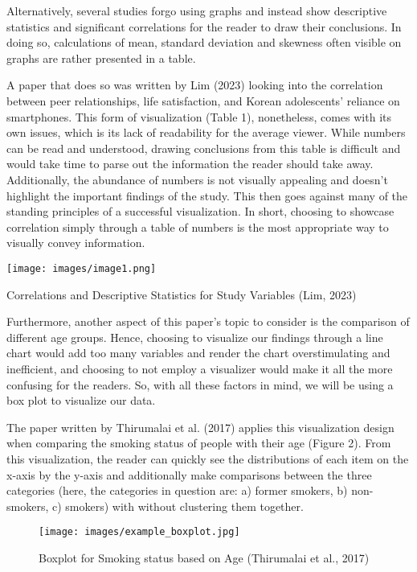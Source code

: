 \documentclass[12pt, a4paper]{article}
\begin{document}
\par Alternatively, several studies forgo using graphs and instead show descriptive statistics and significant correlations for the reader to draw their conclusions. In doing so, calculations of mean, standard deviation and skewness often visible on graphs are rather presented in a table.
\par A paper that does so was written by Lim (2023) looking into the correlation between peer relationships, life satisfaction, and Korean adolescents' reliance on smartphones. This form of visualization (Table 1), nonetheless, comes with its own issues, which is its lack of readability for the average viewer. While numbers can be read and understood, drawing conclusions from this table is difficult and would take time to parse out the information the reader should take away. Additionally, the abundance of numbers is not visually appealing and doesn’t highlight the important findings of the study. This then goes against many of the standing principles of a successful visualization. In short, choosing to showcase correlation simply through a table of numbers is the most appropriate way to visually convey information.
\begin{table}[h]
    \centering
    \texttt{[image: images/image1.png]}
    \caption{Correlations and Descriptive Statistics for Study Variables (Lim, 2023)}
    \label{fig:line_chart}
\end{table}
\par Furthermore, another aspect of this paper’s topic to consider is the comparison of different age groups. Hence, choosing to visualize our findings through a line chart would add too many variables and render the chart overstimulating and inefficient, and choosing to not employ a visualizer would make it all the more confusing for the readers. So, with all these factors in mind, we will be using a box plot to visualize our data.
\par The paper written by Thirumalai et al. (2017) applies this visualization design when comparing the smoking status of people with their age (Figure 2). From this visualization, the reader can quickly see the distributions of each item on the x-axis by the y-axis and additionally make comparisons between the three categories (here, the categories in question are: a) former smokers, b) non-smokers, c) smokers) with without clustering them together.
\begin{figure}[h]
    \centering
    \texttt{[image: images/example\_boxplot.jpg]}
    \caption{Boxplot for Smoking status based on Age (Thirumalai et al., 2017)}
    \label{fig:line_chart}
\end{figure}
\end{document}
